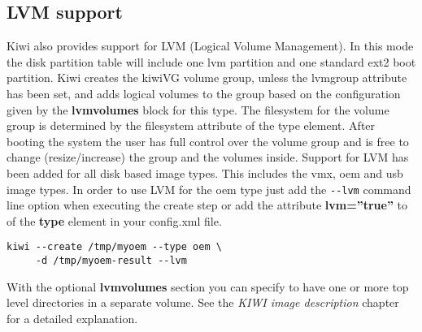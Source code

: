 
\subsection{LVM support}

Kiwi also provides support for LVM (Logical Volume Management). In this
mode the disk partition table will include one lvm partition and one
standard ext2 boot partition. Kiwi creates the kiwiVG volume group, unless
the lvmgroup attribute has been set, and adds logical volumes to the group
based on the configuration given by the \textbf{lvmvolumes} block
for this type. The filesystem for the volume group is determined by the
filesystem attribute of the type element. After booting the system the user
has full control over the volume group and is free to change
(resize/increase) the group and the volumes inside. Support for LVM has
been added for all disk based image types. This includes the vmx, oem and
usb image types. In order to use LVM for the oem type just add the 
\verb+--lvm+ command line option when executing the create step or add
the attribute \textbf{lvm=''true''} to of the \textbf{type} 
element in your config.xml file.

\begin{Command}{12cm}
\begin{verbatim}
kiwi --create /tmp/myoem --type oem \
     -d /tmp/myoem-result --lvm
\end{verbatim}
\end{Command}

With the optional \textbf{lvmvolumes} section you can specify to have 
one or more top level directories in a separate volume. See the
\textit{KIWI image description} chapter for a detailed explanation.
